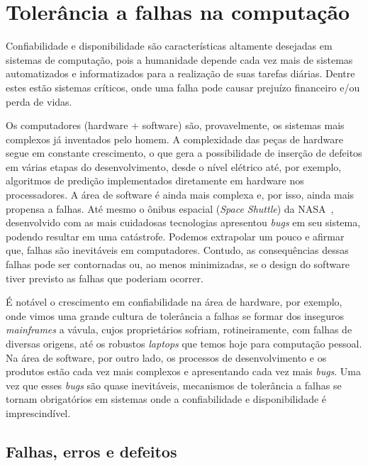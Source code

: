 \section{Tolerância a falhas na computação}
\label{sec:falhas_comp}


Confiabilidade e disponibilidade são características altamente desejadas em sistemas de computação, pois a humanidade depende cada vez mais de sistemas automatizados e informatizados para a realização de suas tarefas diárias. Dentre estes estão sistemas críticos, onde uma falha pode causar prejuízo financeiro e/ou perda de vidas.

Os computadores (hardware + software) são, provavelmente, os sistemas mais complexos já inventados pelo homem. A complexidade das peças de hardware segue em constante crescimento, o que gera a possibilidade de inserção de defeitos em várias etapas do desenvolvimento, desde o nível elétrico até, por exemplo, algoritmos de predição implementados diretamente em hardware nos processadores. A área de software é ainda mais complexa e, por isso, ainda mais propensa a falhas. Até mesmo o ônibus espacial (\emph{Space Shuttle}) da NASA~\cite{BonacheaOnline}, desenvolvido com as mais cuidadosas tecnologias apresentou \emph{bugs} em seu sistema, podendo resultar em uma catástrofe. Podemos extrapolar um pouco e afirmar que, falhas são inevitáveis em computadores. Contudo, as consequências dessas falhas pode ser contornadas ou, ao menos minimizadas, se o design do software tiver previsto as falhas que poderiam ocorrer.

É notável o crescimento em confiabilidade na área de hardware, por exemplo, onde vimos uma grande cultura de tolerância a falhas se formar dos inseguros \emph{mainframes} a vávula, cujos proprietários sofriam, rotineiramente, com falhas de diversas origens, até os robustos \emph{laptops} que temos hoje para computação pessoal. Na área de software, por outro lado, os processos de desenvolvimento e os produtos estão cada vez mais complexos e apresentando cada vez mais \emph{bugs}. Uma vez que esses \emph{bugs} são quase inevitáveis, mecanismos de tolerância a falhas se tornam obrigatórios em sistemas onde a confiabilidade e disponibilidade é imprescindível.

\subsection{Falhas, erros e defeitos} %
\label{sub:falhas_erros_e_defeitos}

